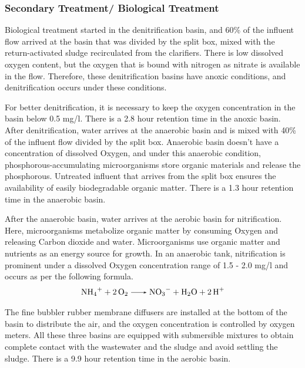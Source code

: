 \subsubsection{Secondary Treatment/ Biological Treatment}
Biological treatment started in the denitrification basin, and 60\% of the influent flow arrived at the basin that was divided by the split box, mixed with the return-activated sludge recirculated from the clarifiers. There is low dissolved oxygen content, but the oxygen that is bound with nitrogen as nitrate is available in the flow. Therefore, these denitrification basins have anoxic conditions, and denitrification occurs under these conditions.


For better denitrification, it is necessary to keep the oxygen concentration in the basin below 0.5 \unit{mg/l}. There is a 2.8 \unit{hour} retention time in the anoxic basin. After denitrification, water arrives at the anaerobic basin and is mixed with 40\% of the influent flow divided by the split box. Anaerobic basin doesn't have a concentration of dissolved Oxygen, and under this anaerobic condition, phosphorous-accumulating microorganisms store organic materials and release the phosphorous. Untreated influent that arrives from the split box ensures the availability of easily biodegradable organic matter. There is a 1.3 \unit{hour} retention time in the anaerobic basin.

After the anaerobic basin, water arrives at the aerobic basin for nitrification. Here, microorganisms metabolize organic matter by consuming Oxygen and releasing Carbon dioxide and water. Microorganisms use organic matter and nutrients as an energy source for growth. In an anaerobic tank, nitrification is prominent under a dissolved Oxygen concentration range of 1.5 - 2.0 \unit{mg/l} and occurs as per the following formula.
\begin{gather}
    \ce{NH4^+ + 2 O2 -> NO3-  + H2O  + 2 H+ }
\end{gather}

The fine bubbler rubber membrane diffusers are installed at the bottom of the basin to distribute the air, and the oxygen concentration is controlled by oxygen meters. All these three basins are equipped with submersible mixtures to obtain complete contact with the wastewater and the sludge and avoid settling the sludge. There is a 9.9 \unit{hour} retention time in the aerobic basin.

